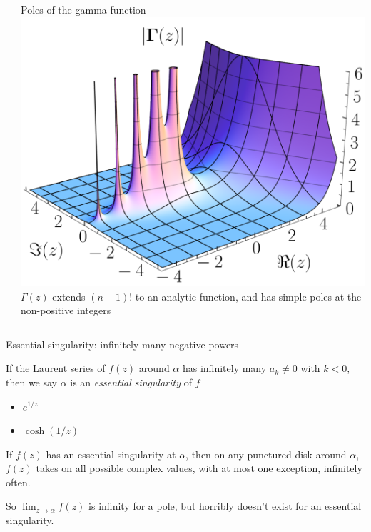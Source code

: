 \documentclass{beamer}
\begin{document}
\begin{frame}[plain]
\begin{columns}
\begin{column}{0.5\textwidth}
\end{column}
\begin{column}{0.5\textwidth}
\begin{block}{Poles of the gamma function}
\includegraphics[width=\textwidth,keepaspectratio]{GammaPoles.png}
$\Gamma(z)$ extends $(n-1)!$ to an analytic function, and has simple poles at the non-positive integers
\end{block}
\end{column}
\end{columns}

\end{frame}
\begin{frame}{Essential singularity: infinitely many negative powers}
\begin{definition} If the Laurent series of $f(z)$ around $\alpha$ has infinitely many $a_{k}\neq 0$ with $k<0$, then we say $\alpha$ is an \emph{essential singularity} of $f$\end{definition}


\begin{examples}
\begin{itemize}
    \item $e^{1/z}$
    \item $\cosh(1/z)$
\end{itemize}
\end{examples}

\begin{theorem}
If $f(z)$ has an essential singularity at $\alpha$, then on any punctured disk around $\alpha$, $f(z)$ takes on all possible complex values, with at most one exception, infinitely often.
\end{theorem}
So $\lim_{z\to\alpha} f(z)$ is infinity for a pole, but horribly doesn't exist for an essential singularity.

\end{frame}
\end{document}
